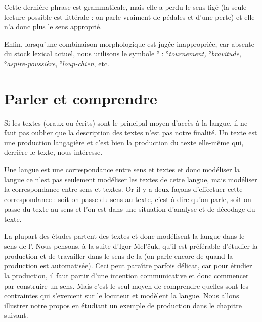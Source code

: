 \ea
\z
\z

Cette dernière phrase est grammaticale, mais elle a perdu le sens figé (la seule lecture possible est littérale : on parle vraiment de pédales et d’une perte) et elle n’a donc plus le sens approprié.

Enfin, lorsqu’une combinaison morphologique est jugée inappropriée, car absente du stock lexical actuel, nous utilisons le symbole ° : °\textit{tournement,} °\textit{bravitude}, °\textit{aspire-poussière}, °\textit{loup-chien}, etc.

\section{Parler et comprendre}\label{sec:1.1.12}

Si les textes (oraux ou écrits) sont le principal moyen d’accès à la langue, il ne faut pas oublier que la description des textes n’est pas notre finalité. Un texte est une production langagière et c’est bien la production du texte elle-même qui, derrière le texte, nous intéresse.

Une langue est une correspondance entre sens et textes et donc modéliser la langue ce n’est pas seulement modéliser les textes de cette langue, mais modéliser la correspondance entre sens et textes. Or il y a deux façons d’effectuer cette correspondance : soit on passe du sens au texte, c’est-à-dire qu’on parle, soit on passe du texte au sens et l’on est dans une situation d’analyse et de décodage du texte.

La plupart des études partent des textes et donc modélisent la langue dans le sens de l’. Nous pensons, à la suite d’Igor Mel’čuk, qu’il est préférable d’étudier la production et de travailler dans le sens de la  (on parle encore de  quand la production est automatisée). Ceci peut paraître parfois délicat, car pour étudier la production, il faut partir d’une intention communicative et donc commencer par construire un sens. Mais c’est le seul moyen de comprendre quelles sont les contraintes qui s’exercent sur le locuteur et modèlent la langue. Nous allons illustrer notre propos en étudiant un exemple de production dans le chapitre suivant.

